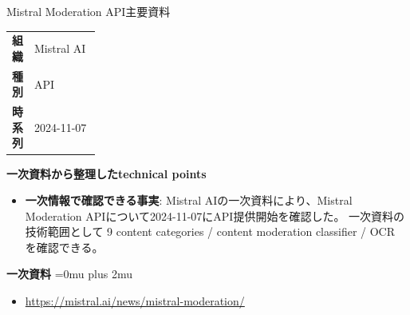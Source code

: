 \begin{technicalnote}{Mistral Moderation API}{主要資料}
\begingroup
\begin{tabularx}{\linewidth}{@{}>{\bfseries}p{0.22\linewidth}X@{}}
組織 & Mistral AI \\
種別 & API \\
時系列 & 2024-11-07 \\
\end{tabularx}
\smallskip
{\bfseries 一次資料から整理したtechnical points}
\begin{itemize}[leftmargin=1.5em,itemsep=0.35em]
\item \textbf{一次情報で確認できる事実}: Mistral AIの一次資料により、Mistral Moderation APIについて2024-11-07にAPI提供開始を確認した。 一次資料の技術範囲として 9 content categories / content moderation classifier / OCR を確認できる。
\end{itemize}
\begin{minipage}{\linewidth}
\begin{samepage}
{\bfseries 一次資料}
\begingroup\sloppy
\Urlmuskip=0mu plus 2mu\relax
\begin{itemize}[leftmargin=1.5em,itemsep=0.25em]
\item {\scriptsize\url{https://mistral.ai/news/mistral-moderation/}}
\end{itemize}
\endgroup
\end{samepage}
\end{minipage}
\endgroup
\end{technicalnote}
\medskip

